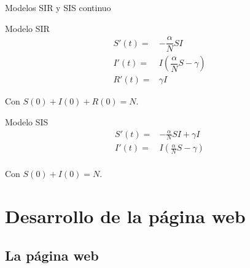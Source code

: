 \begin{frame}{Modelos SIR y SIS continuo}

    \begin{block}{Modelo SIR}
        \begin{equation}
            \label{eqn: modelo_SIR_continuo}
            \begin{aligned}
            S'(t) = & -\dfrac{\alpha}{N}SI \\
            I'(t) = & I\left(\dfrac{\alpha}{N}S-\gamma \right) \\
            R'(t) = & \gamma I
            \end{aligned}
            \end{equation}
            
            Con $S(0)+I(0)+R(0)=N$.
    \end{block}

    \pause

    \begin{block}{Modelo SIS}
        \begin{equation}
            \label{eqn: modelo_SIS_continuo}
            \begin{aligned}
            S'(t) = & -\frac{\alpha}{N}SI+\gamma I \\
            I'(t) = & I\left( \frac{\alpha}{N}S-\gamma \right) \\
            \end{aligned}
            \end{equation}
        
            Con $S(0)+I(0)=N$. 
        \end{block}
\end{frame}




\section{Desarrollo de la página web}


\subsection{La página web}


